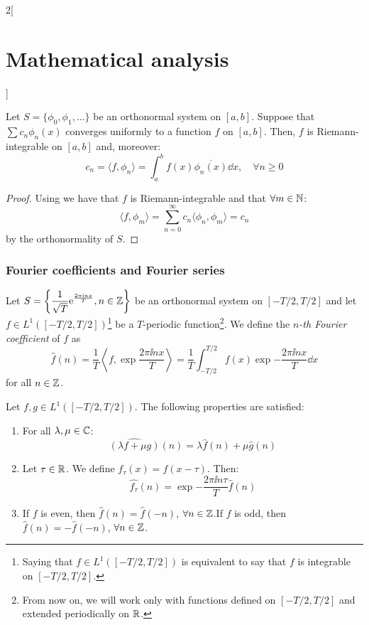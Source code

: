 \documentclass[../../../main_math.tex]{subfiles}
\begin{document}
\begin{multicols}{2}[\section{Mathematical analysis}]
\begin{definition}
  \end{definition}
  \begin{theorem}
    Let $S=\{\phi_0,\phi_1,\ldots\}$ be an orthonormal system on $[a,b]$. Suppose that $\sum c_n\phi_n(x)$ converges uniformly to a function $f$ on $[a,b]$. Then, $f$ is Riemann-integrable on $[a,b]$ and, moreover: $$c_n=\langle f,\phi_n\rangle=\int_a^bf(x)\overline{\phi_n(x)}\dd{x},\quad\forall n\geq 0$$
  \end{theorem}
  \begin{proof}
    Using  we have that $f$ is Riemann-integrable and that $\forall m\in\mathbb{N}$:
    $$\langle f,\phi_m\rangle=\sum_{n=0}^\infty c_n\langle \phi_n,\phi_m\rangle = c_n$$
    by the orthonormality of $S$.
  \end{proof}
  \subsubsection{Fourier coefficients and Fourier series}
  \begin{definition}
    Let $\displaystyle S=\left\{\frac{1}{\sqrt{T}}\mathrm{e}^{\frac{2\pi\mathrm{i} nx}{T}},n\in\mathbb{Z} \right\}$ be an orthonormal system on $[-T/2,T/2]$ and let $f\in L^1([-T/2,T/2])$\footnote{Saying that $f\in L^1([-T/2,T/2])$ is equivalent to say that $f$ is integrable on $[-T/2,T/2]$.} be a $T$-periodic function\footnote{From now on, we will work only with functions defined on $[-T/2,T/2]$ and extended periodically on $\mathbb{R} $.}. We define the \emph{$n$-th Fourier coefficient} of $f$ as $$\widehat{f}(n)=\frac{1}{T}\left\langle f,\exp{\frac{2\pi\ii nx}{T}}\right\rangle=\frac{1}{T}\int_{-T/2}^{T/2}f(x)\exp{-\frac{2\pi\ii nx}{T}}\dd{x}$$ for all $n\in\mathbb{Z} $.
  \end{definition}
  \begin{proposition}
    Let $f,g\in L^1([-T/2,T/2])$. The following properties are satisfied:
    \begin{enumerate}
      \item For all $\lambda,\mu\in\mathbb{C} $:
            $$\widehat{(\lambda f+\mu g)}(n)=\lambda\widehat{f}(n)+\mu\widehat{g}(n)$$
            \item\label{MA:fouriercoeffs2} Let $\tau\in\mathbb{R} $. We define $f_\tau(x)=f(x-\tau)$. Then: $$\widehat{f_\tau}(n)=\exp{-\frac{2\pi\ii n\tau}{T}}\widehat{f}(n)$$
      \item If $f$ is even, then $\widehat{f}(n)=\widehat{f}(-n)$, $\forall n\in\mathbb{Z} $.\newline If $f$ is odd, then $\widehat{f}(n)=-\widehat{f}(-n)$, $\forall n\in\mathbb{Z} $.

\end{enumerate}
\end{proposition}
\end{multicols}
\end{document}
